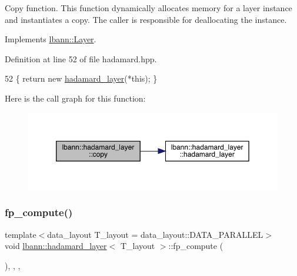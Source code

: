 Copy function. This function dynamically allocates memory for a layer instance and instantiates a copy. The caller is responsible for deallocating the instance. 

Implements \hyperlink{classlbann_1_1Layer_af420f22bbac801c85483ade84588a23f}{lbann\+::\+Layer}.



Definition at line 52 of file hadamard.\+hpp.


\begin{DoxyCode}
52 \{ \textcolor{keywordflow}{return} \textcolor{keyword}{new} \hyperlink{classlbann_1_1hadamard__layer_af79b4f3d1e2709092b36fb0f38d30430}{hadamard\_layer}(*\textcolor{keyword}{this}); \}
\end{DoxyCode}
Here is the call graph for this function\+:\nopagebreak
\begin{figure}[H]
\begin{center}
\leavevmode
\includegraphics[width=350pt]{classlbann_1_1hadamard__layer_ae194aeb83fefa09a45ff4b534839e667_cgraph}
\end{center}
\end{figure}
\mbox{\label{classlbann_1_1hadamard__layer_a8be44f24f2290b06b104294d1fe31d41}} 
\subsubsection{\texorpdfstring{fp\+\_\+compute()}{fp\_compute()}}
{\footnotesize\ttfamily template$<$data\+\_\+layout T\+\_\+layout = data\+\_\+layout\+::\+D\+A\+T\+A\+\_\+\+P\+A\+R\+A\+L\+L\+EL$>$ \\
void \hyperlink{classlbann_1_1hadamard__layer}{lbann\+::hadamard\+\_\+layer}$<$ T\+\_\+layout $>$\+::fp\+\_\+compute (\begin{DoxyParamCaption}{ }\end{DoxyParamCaption})\hspace{0.3cm}{\ttfamily [inline]}, {\ttfamily [override]}, {\ttfamily [protected]}, {\ttfamily [virtual]}}

